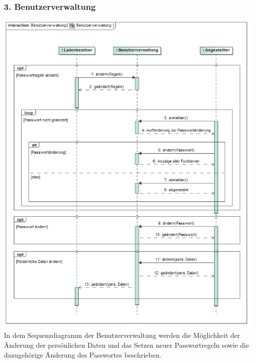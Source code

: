\documentclass[pdftex,12pt,a4paper]{article}
\begin{document}
\subsubsection*{3. Benutzerverwaltung}
\includegraphics[width=1\textwidth]{./images/benutzerverwaltung}
In dem Sequenzdiagramm der Benutzerverwaltung werden die M\"oglichkeit der \"Anderung der pers\"onlichen Daten und das Setzen neuer Passwortregeln sowie die dazugeh\"orige \"Anderung des Passwortes beschrieben.
\end{document}

